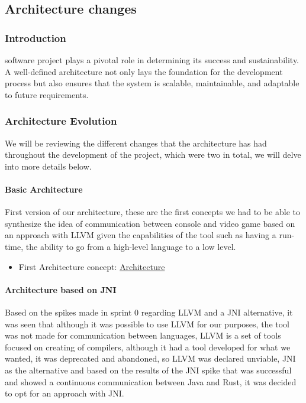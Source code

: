 \subsection{Architecture changes}

\subsubsection{Introduction}
software project plays a pivotal role in determining its success and sustainability. A well-defined architecture not only lays the foundation for the development process but also ensures that the system is scalable, maintainable, and adaptable to future requirements.
\subsubsection{Architecture Evolution}
We will be reviewing the different changes that the architecture has had throughout the development of the project, which were two in total, we will delve into more details below.
\paragraph{Basic Architecture}
First version of our architecture, these are the first concepts we had to be able to synthesize the idea of communication between console and video game based on an approach with LLVM given the capabilities of the tool such as having a run-time, the ability to go from a high-level language to a low level.

\begin{itemize}
    \item First Architecture concept: \href{https://github.com/Pending-Name-21/arquitecture/pull/1/files}{Architecture}
\end{itemize}

\paragraph{Architecture based on JNI}
Based on the spikes made in sprint 0 regarding LLVM and a JNI alternative, it was seen that although it was possible to use LLVM for our purposes, the tool was not made for communication between languages, LLVM is a set of tools focused on creating of compilers, although it had a tool developed for what we wanted, it was deprecated and abandoned, so LLVM was declared unviable, JNI as the alternative and based on the results of the JNI spike that was successful and showed a continuous communication between Java and Rust, it was decided to opt for an approach with JNI.

